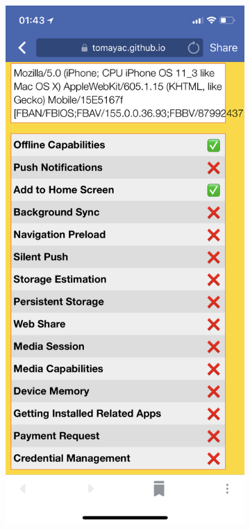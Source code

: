 \documentclass[sigconf]{acmart}
\begin{document}
\begin{figure}[h]
  \centering
  \begin{subfigure}[t]{0.475\columnwidth}
    \includegraphics[width=1\columnwidth,frame]{pwa-feature-detector-facebook-ios-safari11_1}

\end{subfigure}
\end{figure}
\end{document}
